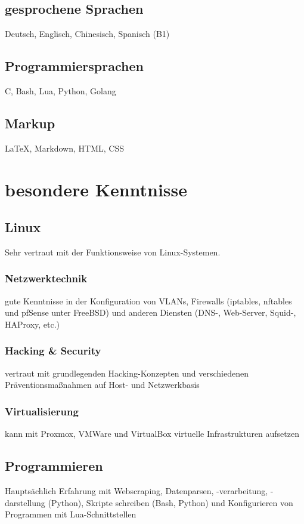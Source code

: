 \documentclass{article}
\begin{document}
\subsection{gesprochene Sprachen}
Deutsch, Englisch, Chinesisch, Spanisch (B1)

\subsection{Programmiersprachen}
C, Bash, Lua, Python, Golang

\subsection{Markup}
\LaTeX, Markdown, HTML, CSS

\section{besondere Kenntnisse}

\subsection{Linux}
Sehr vertraut mit der Funktionsweise von Linux-Systemen.

\subsubsection{Netzwerktechnik}
gute Kenntnisse in der Konfiguration von VLANs, Firewalls (iptables, nftables und pfSense unter FreeBSD) und anderen Diensten (DNS-, Web-Server, Squid-, HAProxy, etc.)

\subsubsection{Hacking \& Security}
vertraut mit grundlegenden Hacking-Konzepten und verschiedenen Präventionsmaßnahmen auf Host- und Netz\-werkbasis

\subsubsection{Virtualisierung}
kann mit Proxmox, VMWare und VirtualBox virtuelle Infrastrukturen aufsetzen

\subsection{Programmieren}
Hauptsächlich Erfahrung mit Webscraping, Datenparsen, -verarbeitung, -darstellung (Python), Skripte schreiben (Bash, Python) und Konfigurieren von Programmen mit Lua-Schnittstellen
\end{document}
